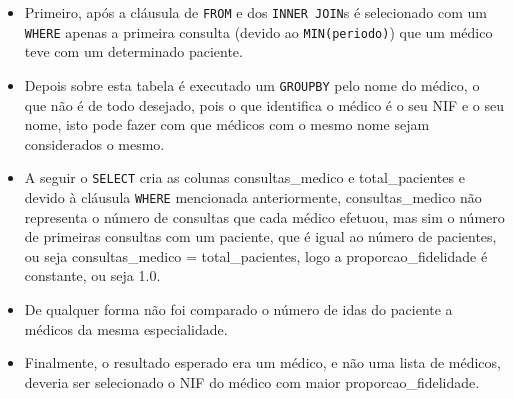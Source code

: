 \documentclass{article}
\begin{document}
\begin{itemize}
    \item Primeiro, após a cláusula de \texttt{FROM} e dos \texttt{INNER JOIN}s é selecionado com um \texttt{WHERE} apenas a primeira consulta (devido ao \texttt{MIN(periodo)}) que um médico teve com um determinado paciente.
    \item Depois sobre esta tabela é executado um \texttt{GROUPBY} pelo nome do médico, o que não é de todo desejado, pois o que identifica o médico é o seu NIF e o seu nome, isto pode fazer com que médicos com o mesmo nome sejam considerados o mesmo.
    \item A seguir o \texttt{SELECT} cria as colunas consultas\_medico e total\_pacientes e devido à cláusula \texttt{WHERE} mencionada anteriormente, consultas\_medico não representa o número de consultas que cada médico efetuou, mas sim o número de primeiras consultas com um paciente, que é igual ao número de pacientes, ou seja  consultas\_medico = total\_pacientes, logo a proporcao\_fidelidade é constante, ou seja 1.0.
    \item De qualquer forma não foi comparado o número de idas do paciente a médicos da mesma especialidade.
    \item Finalmente, o resultado esperado era um médico, e não uma lista de médicos, deveria ser selecionado o NIF do médico com maior proporcao\_fidelidade.
\end{itemize}

\newpage

\end{document}
